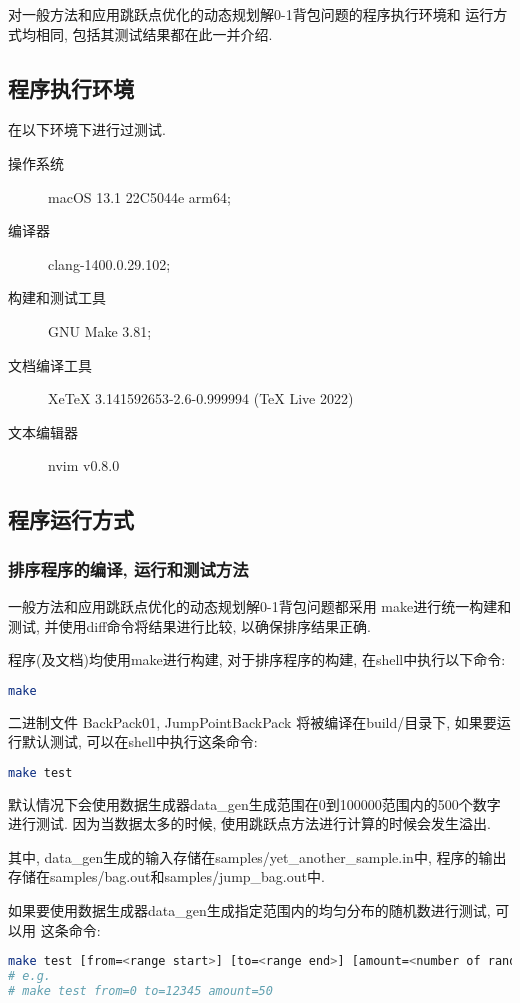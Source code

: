 对一般方法和应用跳跃点优化的动态规划解0-1背包问题的程序执行环境和
运行方式均相同, 包括其测试结果都在此一并介绍.

\subsection{程序执行环境}
在以下环境下进行过测试.

\begin{description}
	\item[操作系统] macOS 13.1 22C5044e arm64;
	\item[编译器] clang-1400.0.29.102;
	\item[构建和测试工具] GNU Make 3.81;
	\item[文档编译工具] XeTeX 3.141592653-2.6-0.999994 (TeX Live 2022)
	\item[文本编辑器] nvim v0.8.0
\end{description}

\subsection{程序运行方式}
\subsubsection{排序程序的编译, 运行和测试方法}
一般方法和应用跳跃点优化的动态规划解0-1背包问题都采用
make进行统一构建和测试, 并使用diff命令将结果进行比较,
以确保排序结果正确.\par

程序(及文档)均使用make进行构建, 对于排序程序的构建, 在shell中执行以下命令:
\begin{lstlisting}[language=bash]
make
\end{lstlisting}
二进制文件 BackPack01, JumpPointBackPack 将被编译在build/目录下,
如果要运行默认测试, 可以在shell中执行这条命令:
\begin{lstlisting}[language=bash]
make test
\end{lstlisting}
默认情况下会使用数据生成器data\_gen生成范围在0到100000范围内的500个数字进行测试.
因为当数据太多的时候, 使用跳跃点方法进行计算的时候会发生溢出.\par

其中, data\_gen生成的输入存储在samples/yet\_another\_sample.in中,
程序的输出存储在samples/bag.out和samples/jump\_bag.out中. \par

如果要使用数据生成器data\_gen生成指定范围内的均匀分布的随机数进行测试, 可以用
这条命令:
\begin{lstlisting}[language=bash]
make test [from=<range start>] [to=<range end>] [amount=<number of random numbers>]
# e.g. 
# make test from=0 to=12345 amount=50
\end{lstlisting}

